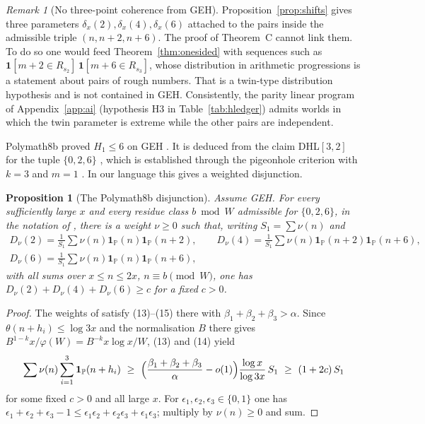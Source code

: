 \documentclass[11pt]{amsart}
\newtheorem{proposition}[theorem]{Proposition}
\theoremstyle{definition}
\theoremstyle{remark}
\newtheorem{remark}[theorem]{Remark}
\newcommand{\PP}{\mathbb{P}}
\begin{document}
\begin{remark}[No three-point coherence from GEH]\label{rem:threepoint}
Proposition~\ref{prop:shifts} gives three parameters $\delta_x(2),\delta_x(4),\delta_x(6)$ attached to the pairs inside the admissible triple $(n,n+2,n+6)$. The proof of Theorem~C cannot link them. To do so one would feed Theorem~\ref{thm:onesided} with sequences such as $\mathbf 1[m+2\in R_{s_2}]\,\mathbf 1[m+6\in R_{s_3}]$, whose distribution in arithmetic progressions is a statement about pairs of rough numbers. That is a twin-type distribution hypothesis and is not contained in GEH. Consistently, the parity linear program of Appendix~\ref{app:ai} (hypothesis H3 in Table~\ref{tab:hledger}) admits worlds in which the twin parameter is extreme while the other pairs are independent.
\end{remark}

Polymath8b proved $H_1\le6$ on GEH \cite[Thm.~1.4(xii)]{Polymath8b}. It is deduced from the claim DHL$[3,2]$ for the tuple $\{0,2,6\}$ \cite[Thm.~3.2(xii)]{Polymath8b}, which is established through the pigeonhole criterion \cite[Lemma~3.4]{Polymath8b} with $k=3$ and $m=1$ \cite[Table~1]{Polymath8b}. In our language this gives a weighted disjunction.

\begin{proposition}[The Polymath8b disjunction]\label{prop:disjunction}
Assume GEH. For every sufficiently large $x$ and every residue class $b\bmod W$ admissible for $\{0,2,6\}$, in the notation of \cite[Lemma~3.4]{Polymath8b}, there is a weight $\nu\ge0$ such that, writing $S_1=\sum\nu(n)$ and
\begin{gather*}
D_\nu(2)=\frac1{S_1}\sum\nu(n)\mathbf 1_{\PP}(n)\mathbf 1_{\PP}(n+2),\qquad
D_\nu(4)=\frac1{S_1}\sum\nu(n)\mathbf 1_{\PP}(n+2)\mathbf 1_{\PP}(n+6),\\
D_\nu(6)=\frac1{S_1}\sum\nu(n)\mathbf 1_{\PP}(n)\mathbf 1_{\PP}(n+6),
\end{gather*}
with all sums over $x\le n\le2x$, $n\equiv b\pmod W$, one has $D_\nu(2)+D_\nu(4)+D_\nu(6)\ge c$ for a fixed $c>0$.
\end{proposition}
\begin{proof}
The weights of \cite[Lemma~3.4]{Polymath8b} satisfy (13)--(15) there with $\beta_1+\beta_2+\beta_3>\alpha$. Since $\theta(n+h_i)\le\log3x$ and the normalisation $B$ there gives $B^{1-k}x/\varphi(W)=B^{-k}x\log x/W$, (13) and (14) yield
\[
\sum\nu(n)\sum_{i=1}^3\mathbf 1_{\PP}(n+h_i)\ \ge\ \Bigl(\frac{\beta_1+\beta_2+\beta_3}{\alpha}-o(1)\Bigr)\frac{\log x}{\log3x}\,S_1\ \ge\ (1+2c)\,S_1
\]
for some fixed $c>0$ and all large $x$. For $\epsilon_1,\epsilon_2,\epsilon_3\in\{0,1\}$ one has $\epsilon_1+\epsilon_2+\epsilon_3-1\le\epsilon_1\epsilon_2+\epsilon_2\epsilon_3+\epsilon_1\epsilon_3$; multiply by $\nu(n)\ge0$ and sum.
\end{proof}
\end{document}
